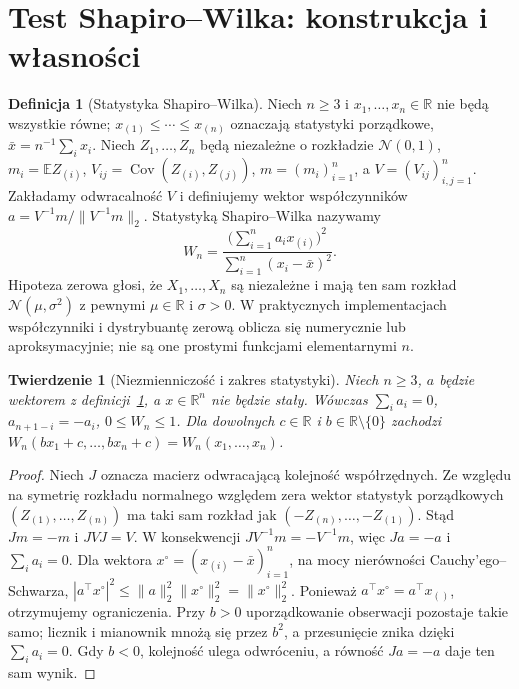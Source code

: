\documentclass[11pt,a4paper,oneside]{report}
\numberwithin{equation}{chapter}
\theoremstyle{plain}
\newtheorem{twierdzenie}{Twierdzenie}[chapter]
\theoremstyle{definition}
\newtheorem{definicja}{Definicja}[chapter]
\theoremstyle{remark}
\newcommand{\R}{\mathbb R}
\newcommand{\E}{\mathbb E}
\newcommand{\Cov}{\operatorname{Cov}}
\newcommand{\Normal}{\mathcal N}
\begin{document}
\section{Test Shapiro--Wilka: konstrukcja i własności}
\begin{definicja}[Statystyka Shapiro--Wilka]\label{def:shapiro-wilk}
Niech $n\ge3$ i $x_1,\ldots,x_n\in\R$ nie będą wszystkie równe; $x_{(1)}\le\cdots\le x_{(n)}$ oznaczają statystyki porządkowe, $\bar x=n^{-1}\sum_i x_i$. Niech $Z_1,\ldots,Z_n$ będą niezależne o rozkładzie $\Normal(0,1)$, $m_i=\E Z_{(i)}$, $V_{ij}=\Cov(Z_{(i)},Z_{(j)})$, $m=(m_i)_{i=1}^n$, a $V=(V_{ij})_{i,j=1}^n$. Zakładamy odwracalność $V$ i definiujemy wektor współczynników $a=V^{-1}m/\|V^{-1}m\|_2$. Statystyką Shapiro--Wilka nazywamy
\[
 W_n=\frac{\bigl(\sum_{i=1}^n a_i x_{(i)}\bigr)^2}{\sum_{i=1}^n(x_i-\bar x)^2}.
\]
Hipoteza zerowa głosi, że $X_1,\ldots,X_n$ są niezależne i mają ten sam rozkład $\Normal(\mu,\sigma^2)$ z pewnymi $\mu\in\R$ i $\sigma>0$. W praktycznych implementacjach współczynniki i dystrybuantę zerową oblicza się numerycznie lub aproksymacyjnie; nie są one prostymi funkcjami elementarnymi $n$.
\end{definicja}

\begin{twierdzenie}[Niezmienniczość i zakres statystyki]\label{thm:shapiro-properties}
Niech $n\ge3$, $a$ będzie wektorem z definicji~\ref{def:shapiro-wilk}, a $x\in\R^n$ nie będzie stały. Wówczas $\sum_i a_i=0$, $a_{n+1-i}=-a_i$, $0\le W_n\le1$. Dla dowolnych $c\in\R$ i $b\in\R\setminus\{0\}$ zachodzi $W_n(bx_1+c,\ldots,bx_n+c)=W_n(x_1,\ldots,x_n)$.
\end{twierdzenie}
\begin{proof}
Niech $J$ oznacza macierz odwracającą kolejność współrzędnych. Ze względu na symetrię rozkładu normalnego względem zera wektor statystyk porządkowych $(Z_{(1)},\ldots,Z_{(n)})$ ma taki sam rozkład jak $(-Z_{(n)},\ldots,-Z_{(1)})$. Stąd $Jm=-m$ i $JVJ=V$. W konsekwencji $JV^{-1}m=-V^{-1}m$, więc $Ja=-a$ i $\sum_i a_i=0$. Dla wektora $x^\circ=(x_{(i)}-\bar x)_{i=1}^n$, na mocy nierówności Cauchy'ego--Schwarza, $|a^\top x^\circ|^2\le\|a\|_2^2\|x^\circ\|_2^2=\|x^\circ\|_2^2$. Ponieważ $a^\top x^\circ=a^\top x_{()}$, otrzymujemy ograniczenia. Przy $b>0$ uporządkowanie obserwacji pozostaje takie samo; licznik i mianownik mnożą się przez $b^2$, a przesunięcie znika dzięki $\sum_i a_i=0$. Gdy $b<0$, kolejność ulega odwróceniu, a równość $Ja=-a$ daje ten sam wynik.
\end{proof}
\end{document}
